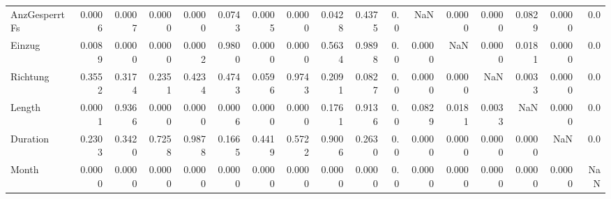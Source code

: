 \begin{tabular}{lrrrrrrrrrrrrrrrr}
AnzGesperrtFs &   0.0006 &   0.0007 &   0.0000 &   0.0000 &    0.0743 &    0.0005 &    0.0000 &  0.0428 &  0.4375 &      0.0 &            NaN &  0.0000 &    0.0000 &  0.0829 &    0.0000 &    0.0 \\
Einzug        &   0.0089 &   0.0000 &   0.0000 &   0.0002 &    0.9800 &    0.0000 &    0.0000 &  0.5634 &  0.9898 &      0.0 &         0.0000 &     NaN &    0.0000 &  0.0181 &    0.0000 &    0.0 \\
Richtung      &   0.3552 &   0.3174 &   0.2351 &   0.4234 &    0.4743 &    0.0596 &    0.9743 &  0.2091 &  0.0827 &      0.0 &         0.0000 &  0.0000 &       NaN &  0.0033 &    0.0000 &    0.0 \\
Length        &   0.0001 &   0.9366 &   0.0000 &   0.0000 &    0.0006 &    0.0000 &    0.0000 &  0.1761 &  0.9136 &      0.0 &         0.0829 &  0.0181 &    0.0033 &     NaN &    0.0000 &    0.0 \\
Duration      &   0.2303 &   0.3420 &   0.7258 &   0.9878 &    0.1665 &    0.4419 &    0.5722 &  0.9006 &  0.2630 &      0.0 &         0.0000 &  0.0000 &    0.0000 &  0.0000 &       NaN &    0.0 \\
Month         &   0.0000 &   0.0000 &   0.0000 &   0.0000 &    0.0000 &    0.0000 &    0.0000 &  0.0000 &  0.0000 &      0.0 &         0.0000 &  0.0000 &    0.0000 &  0.0000 &    0.0000 &    NaN \\
\bottomrule
\end{tabular}
